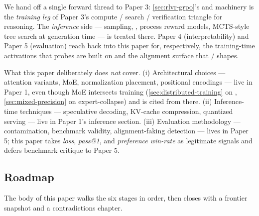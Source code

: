 We hand off a single forward thread to Paper 3:
\cref{sec:rlvr-grpo}'s  and  machinery is the \emph{training
leg} of Paper 3's compute / search / verification triangle for
reasoning. The \emph{inference} side ---  sampling,
, process reward models, MCTS-style tree search at
generation time --- is treated there. Paper 4 (interpretability) and
Paper 5 (evaluation) reach back into this paper for, respectively, the
training-time activations that probes are built on and the alignment
surface that  /  shapes.

What this paper deliberately does \emph{not} cover. (i) Architectural
choices --- attention variants, MoE, normalization placement,
positional encodings --- live in Paper 1, even though MoE intersects
training (\cref{sec:distributed-training} on , \cref{sec:mixed-precision}
on  expert-collapse) and is cited from there. (ii) Inference-time
techniques --- speculative decoding, KV-cache compression, quantized
serving --- live in Paper 1's inference section. (iii) Evaluation
methodology --- contamination, benchmark validity, alignment-faking
detection --- lives in Paper 5; this paper takes \emph{loss}, \emph{pass@1},
and \emph{preference win-rate} as legitimate signals and defers
benchmark critique to Paper 5.

\subsection{Roadmap}
\label{sec:intro-roadmap}

The body of this paper walks the six stages in order, then closes with
a frontier snapshot and a contradictions chapter.

